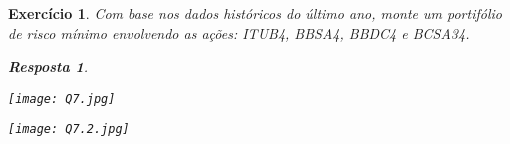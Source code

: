 \documentclass{article}
\newtheorem{ex}{Exercício}
\newtheorem{resp}{Resposta}
\begin{document}
\begin{ex}
    Com base nos dados históricos do último ano, monte um portifólio de risco mínimo envolvendo as ações: ITUB4, BBSA4, BBDC4 e BCSA34.
\begin{resp}
\end{resp}
\begin{center}
\texttt{[image: Q7.jpg]}
\end{center}
\begin{center}
\texttt{[image: Q7.2.jpg]}
\end{center}
\end{ex}

\end{document}
